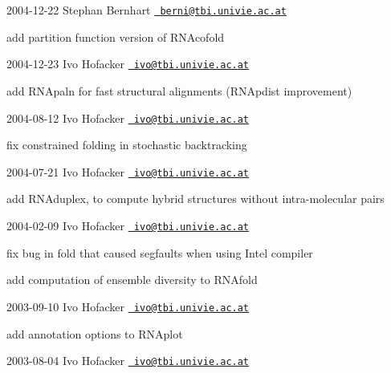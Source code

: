 2004-\/12-\/22 Stephan Bernhart \href{mailto:berni@tbi.univie.ac.at}{\texttt{ berni@tbi.\+univie.\+ac.\+at}}


\begin{DoxyItemize}
\item add partition function version of R\+N\+Acofold
\end{DoxyItemize}

2004-\/12-\/23 Ivo Hofacker \href{mailto:ivo@tbi.univie.ac.at}{\texttt{ ivo@tbi.\+univie.\+ac.\+at}}


\begin{DoxyItemize}
\item add R\+N\+Apaln for fast structural alignments (R\+N\+Apdist improvement)
\end{DoxyItemize}

2004-\/08-\/12 Ivo Hofacker \href{mailto:ivo@tbi.univie.ac.at}{\texttt{ ivo@tbi.\+univie.\+ac.\+at}}


\begin{DoxyItemize}
\item fix constrained folding in stochastic backtracking
\end{DoxyItemize}

2004-\/07-\/21 Ivo Hofacker \href{mailto:ivo@tbi.univie.ac.at}{\texttt{ ivo@tbi.\+univie.\+ac.\+at}}


\begin{DoxyItemize}
\item add R\+N\+Aduplex, to compute hybrid structures without intra-\/molecular pairs
\end{DoxyItemize}

2004-\/02-\/09 Ivo Hofacker \href{mailto:ivo@tbi.univie.ac.at}{\texttt{ ivo@tbi.\+univie.\+ac.\+at}}


\begin{DoxyItemize}
\item fix bug in fold that caused segfaults when using Intel compiler
\item add computation of ensemble diversity to R\+N\+Afold
\end{DoxyItemize}

2003-\/09-\/10 Ivo Hofacker \href{mailto:ivo@tbi.univie.ac.at}{\texttt{ ivo@tbi.\+univie.\+ac.\+at}}


\begin{DoxyItemize}
\item add annotation options to R\+N\+Aplot
\end{DoxyItemize}

2003-\/08-\/04 Ivo Hofacker \href{mailto:ivo@tbi.univie.ac.at}{\texttt{ ivo@tbi.\+univie.\+ac.\+at}}


